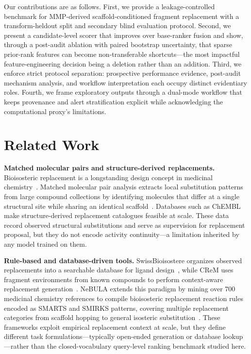 \documentclass[12pt,letterpaper]{article}
\begin{document}
Our contributions are as follows. First, we provide a leakage-controlled benchmark for MMP-derived scaffold-conditioned fragment replacement with a transform-heldout split and secondary blind evaluation protocol. Second, we present a candidate-level scorer that improves over base-ranker fusion and show, through a post-audit ablation with paired bootstrap uncertainty, that sparse prior-rank features can become non-transferable shortcuts---the most impactful feature-engineering decision being a deletion rather than an addition. Third, we enforce strict protocol separation: prospective performance evidence, post-audit mechanism analysis, and workflow interpretation each occupy distinct evidentiary roles. Fourth, we frame exploratory outputs through a dual-mode workflow that keeps provenance and alert stratification explicit while acknowledging the computational proxy's limitations.


\section{Related Work}

\textbf{Matched molecular pairs and structure-derived replacements.}
Bioisosteric replacement is a longstanding design concept in medicinal chemistry~\cite{patani1996bioisosterism}. Matched molecular pair analysis extracts local substitution patterns from large compound collections by identifying molecules that differ at a single structural site while sharing an identical scaffold~\cite{hussain2010computationally,griffen2011matched}. Databases such as ChEMBL~\cite{zdrazil2024chembl} make structure-derived replacement catalogues feasible at scale. These data record observed structural substitutions and serve as supervision for replacement proposal, but they do not encode activity continuity---a limitation inherited by any model trained on them.

\textbf{Rule-based and database-driven tools.}
SwissBioisostere organizes observed replacements into a searchable database for ligand design~\cite{wirth2013swissbioisostere}, while CReM uses fragment environments from known compounds to perform context-aware replacement generation~\cite{polishchuk2020crem}. NeBULA extends this paradigm by mining over 700 medicinal chemistry references to compile bioisosteric replacement reaction rules encoded as SMARTS and SMIRKS patterns, covering multiple replacement categories from scaffold hopping to general isosteric substitution~\cite{huang2025nebula}. These frameworks exploit empirical replacement context at scale, but they define different task formulations---typically open-ended generation or database lookup---rather than the closed-vocabulary query-level ranking benchmark studied here.
\end{document}
